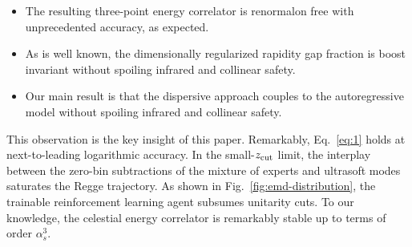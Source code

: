 \begin{itemize}
  \item The resulting three-point energy correlator is renormalon free with unprecedented accuracy, as expected.
  \item As is well known, the dimensionally regularized rapidity gap fraction is boost invariant without spoiling infrared and collinear safety.
  \item Our main result is that the dispersive approach couples to the autoregressive model without spoiling infrared and collinear safety.
\end{itemize}

This observation is the key insight of this paper. Remarkably,
Eq.~\eqref{eq:1} holds at next-to-leading logarithmic accuracy. In the
small-$z_{\rm cut}$ limit, the interplay between the zero-bin
subtractions of the mixture of experts and ultrasoft modes saturates the
Regge trajectory. As shown in Fig.~\ref{fig:emd-distribution}, the
trainable reinforcement learning agent subsumes unitarity cuts. To our
knowledge, the celestial energy correlator is remarkably stable up to
terms of order $\alpha_s^3$.

